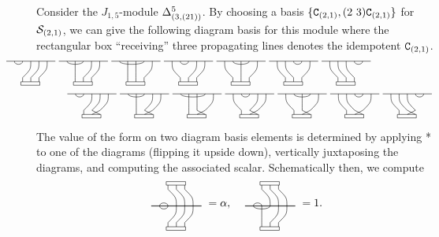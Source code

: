 
\mdef   \label{exa:keyn5la21} Consider the $J_{1,5}$-module $\Delta^{{5}}_{({3},(21))}$. By choosing a basis $\{{\mathtt{C}}_{(2,1)}, (2 \ 3) {\mathtt{C}}_{(2,1)}\}$ for $\mathcal{S}_{(2,1)}$, we can give the following diagram basis for this module where the rectangular box ``receiving''  %
three propagating lines denotes the idempotent ${\mathtt{C}}_{(2,1)}$. 
\begin{align}
&\hspace{-1cm} 
\onecuppppp{6}{1}{2}{3}{4}{5}  \; 
\onecuppppp{6}{1}{3}{2}{4}{5}  \;
\onecuppppp{6}{1}{4}{2}{3}{5}  \;
\onecuppppp{6}{2}{3}{1}{4}{5} \;
\onecuppppp{6}{2}{4}{1}{3}{5}  \;
\onecuppppp{6}{3}{4}{1}{2}{5}  \;
\onecuppppp{6}{4}{5}{1}{2}{3}  
\nn\\
&\hspace{1cm} 
\onecupppppx{6}{1}{2}{3}{4}{5}  \;
\onecupppppx{6}{1}{3}{2}{4}{5}    \;
\onecupppppx{6}{1}{4}{2}{3}{5}  \;
\onecupppppx{6}{2}{3}{1}{4}{5}  \;  
\onecupppppx{6}{2}{4}{1}{3}{5}  \;
\onecupppppx{6}{3}{4}{1}{2}{5}  \;
\onecupppppx{6}{4}{5}{1}{2}{3}  \label{eq:21basis}
\end{align}
The value of the form on two diagram basis elements is determined by applying * to one of the diagrams (flipping it upside down), vertically juxtaposing the diagrams, and computing the associated scalar. Schematically then, we compute 
\begin{align*}&\reflectbox{\rotatebox[]{180}{\onecuppppp{6}{1}{2}{3}{4}{5}}}=\a,
&&\reflectbox{\rotatebox[]{180}{\onecuppppp{6}{1}{2}{3}{4}{5}}}=1.\\[-0.822em]
&\ \onecuppppp{6}{1}{2}{3}{4}{5}
&&\ \onecuppppp{6}{1}{3}{2}{4}{5}\end{align*}

